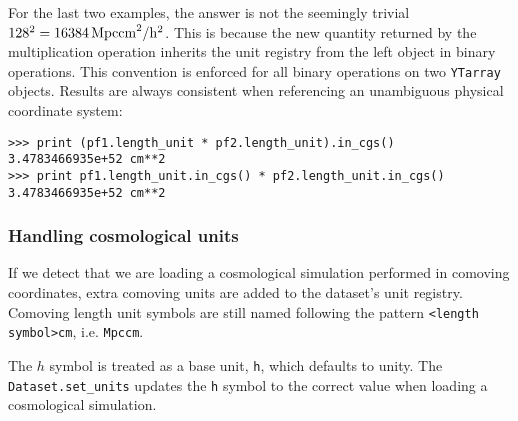 For the last two examples, the answer is not the seemingly trivial
$128^2\/=\/16384\,\rm{Mpccm}^2/h^2$. This is because the new quantity
returned by the multiplication operation inherits the unit registry from
the left object in binary operations. This convention is enforced for
all binary operations on two \texttt{YTarray} objects. Results are
always consistent when referencing an unambiguous physical coordinate system:

\begin{Verbatim}
>>> print (pf1.length_unit * pf2.length_unit).in_cgs() 
3.4783466935e+52 cm**2 
>>> print pf1.length_unit.in_cgs() * pf2.length_unit.in_cgs() 
3.4783466935e+52 cm**2
\end{Verbatim}

\subsubsection{Handling cosmological
units}\label{handling-cosmological-units}

If we detect that we are loading a cosmological simulation performed in comoving
coordinates, extra comoving units are added to the dataset's unit
registry. Comoving length unit symbols are still named following the pattern
\texttt{<length symbol>cm}, i.e. \texttt{Mpccm}.

The $h$ symbol is treated as a base unit, \texttt{h}, which defaults to
unity. The \texttt{Dataset.set\_units} updates the \texttt{h} symbol to
the correct value when loading a cosmological simulation.
